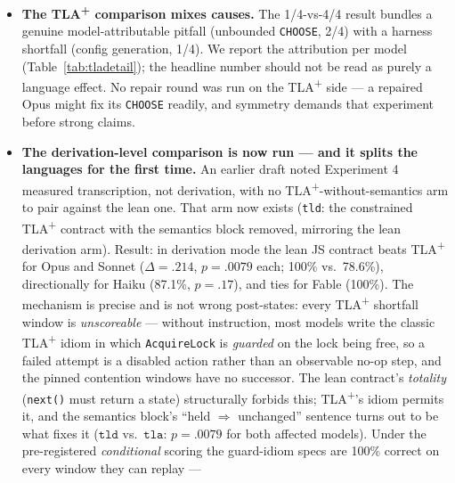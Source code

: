 \documentclass[11pt]{article}
\newcommand{\tlaplus}{TLA\texorpdfstring{\textsuperscript{+}}{+}}
\begin{document}
\begin{itemize}
  re-requests, no deeper contention, and no failure paths. The
  vector-clock reorder's causal premise is \emph{verified per event} at
  corpus build, not assumed: every \texttt{CriticalSection} step reads
  \texttt{GrantMsg} from its mailbox (message-passing happens-before), and
  the builder refuses traces where that check fails. Net: every 100\% in
  this paper means conformance to a two-variable projection of an easy,
  deterministic slice of each system's behavior --- faithful to real
  executions, far from exhausting them --- and the conclusion carries this
  qualifier explicitly.
\item \textbf{The \tlaplus{} comparison mixes causes.} The 1/4-vs-4/4 result
  bundles a genuine model-attributable pitfall (unbounded \texttt{CHOOSE},
  2/4) with a harness shortfall (config generation, 1/4). We report the
  attribution per model (Table~\ref{tab:tladetail}); the headline number
  should not be read as purely a language effect. No repair round was run on
  the \tlaplus{} side --- a repaired Opus might fix its \texttt{CHOOSE}
  readily, and symmetry demands that experiment before strong claims.
\item \textbf{The derivation-level comparison is now run --- and it splits
  the languages for the first time.} An earlier draft noted Experiment 4
  measured transcription, not derivation, with no
  \tlaplus{}-without-semantics arm to pair against the lean one. That arm
  now exists (\texttt{tld}: the constrained \tlaplus{} contract with the
  semantics block removed, mirroring the lean derivation arm). Result: in
  derivation mode the lean JS contract beats \tlaplus{} for Opus and Sonnet
  ($\Delta{=}.214$, $p{=}.0079$ each; 100\% vs.\ 78.6\%), directionally for
  Haiku (87.1\%, $p{=}.17$), and ties for Fable (100\%). The mechanism is
  precise and is not wrong post-states: every \tlaplus{} shortfall window is
  \emph{unscoreable} --- without instruction, most models write the classic
  \tlaplus{} idiom in which \texttt{AcquireLock} is \emph{guarded} on the
  lock being free, so a failed attempt is a disabled action rather than an
  observable no-op step, and the pinned contention windows have no successor.
  The lean contract's \emph{totality} (\texttt{next()} must return a state)
  structurally forbids this; \tlaplus{}'s idiom permits it, and the
  semantics block's ``held $\Rightarrow$ unchanged'' sentence turns out to
  be what fixes it ($\texttt{tld}$ vs.\ $\texttt{tla}$: $p{=}.0079$ for both
  affected models). Under the pre-registered \emph{conditional} scoring the
  guard-idiom specs are 100\% correct on every window they can replay ---

\end{itemize}
\end{document}
